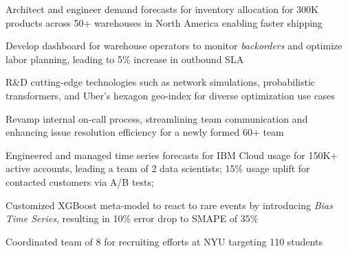 \documentclass[]{deedy-resume-openfont}
\begin{document}
\begin{minipage}[t]{0.66\textwidth}
\begin{tightemize}
\item Architect and engineer demand forecasts for inventory allocation for 300K products across 50+ warehouses in North America enabling faster shipping
\item Develop dashboard for warehouse operators to monitor \textit{backorders} and optimize labor planning, leading to 5\% increase in outbound SLA
\item R\&D cutting-edge technologies such as network simulations, probabilistic transformers, and Uber's hexagon geo-index for diverse optimization use cases
\item Revamp internal on-call process, streamlining team communication and enhancing issue resolution efficiency for a newly formed 60+ team

\end{tightemize}
\sectionsep

\begin{tightemize}
\item Engineered and managed time series forecasts for IBM Cloud usage for 150K+ active accounts, leading a team of 2 data scientists; 15\% usage uplift for contacted customers via A/B tests;
\item Customized XGBoost meta-model to react to rare events by introducing \textit{Bias Time Series}, resulting in 10\% error drop to SMAPE of 35\%
\item Coordinated team of 8 for recruiting efforts at NYU targeting 110 students
\end{tightemize}
\sectionsep





\end{minipage}
\end{document}
